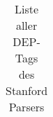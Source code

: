 \begin{table}[h!]
\begin{tabular}{|l|l|l|l|}
	\bottomrule
  \end{tabular}
  \caption{Liste aller DEP-Tags des Stanford Parsers}
  \label{table:DEPTAGS}
\end{table}

